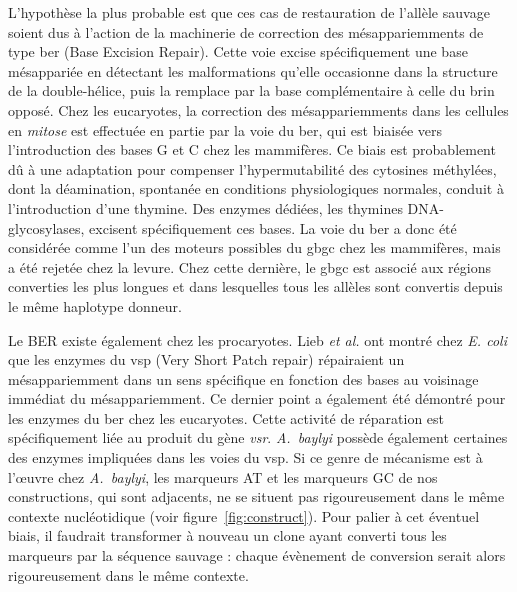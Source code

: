 L'hypothèse la plus probable est que ces cas de restauration de l'allèle sauvage
soient dus à l'action de la machinerie de correction des mésappariemments de
type \ac{ber} (Base Excision Repair). Cette voie excise spécifiquement une base
mésappariée en détectant les malformations qu'elle occasionne dans la structure
de la double-hélice, puis la remplace par la base complémentaire à celle du brin
opposé\cite{krokan_base_2013}. Chez les eucaryotes, la correction des
mésappariemments dans les cellules en \emph{mitose} est effectuée en partie par
la voie du \ac{ber}, qui est biaisée vers l'introduction des bases G et C chez
les mammifères\cite{brown_specific_1987,brown_different_1988}. Ce biais est
probablement dû à une adaptation pour compenser l'hypermutabilité des cytosines
méthylées, dont la déamination, spontanée en conditions physiologiques normales,
conduit à l'introduction d'une thymine. Des enzymes dédiées, les thymines
DNA-glycosylases, excisent spécifiquement ces bases. La voie du \ac{ber} a donc
été considérée comme l'un des moteurs possibles du \ac{gbgc} chez les
mammifères\cite{duret_biased_2009}, mais a été rejetée chez la
levure\cite{lesecque_gc-biased_2013}. Chez cette dernière, le \ac{gbgc} est
associé aux régions converties les plus longues et dans lesquelles tous les
allèles sont convertis depuis le même haplotype donneur.

Le BER existe également chez les procaryotes. Lieb \emph{et
  al.}\cite{lieb_recombination_1985} ont montré chez \emph{E. coli} que les
enzymes du \ac{vsp} (Very Short Patch repair) répairaient un mésappariemment
dans un sens spécifique en fonction des bases au voisinage immédiat du
mésappariemment. Ce dernier point a également été démontré pour les enzymes du
\ac{ber} chez les eucaryotes\cite{brown_different_1988}. Cette activité de
réparation est spécifiquement liée au produit du gène
\emph{vsr}\cite{hennecke_vsr_1991,lieb_specific_1983}. \emph{A.~baylyi} possède
également certaines des enzymes impliquées dans les voies du
\ac{vsp}\cite{kanehisa_kegg_2016}. Si ce genre de mécanisme est à l'œuvre chez
\emph{A.~baylyi}, les marqueurs AT et les marqueurs GC de nos constructions, qui
sont adjacents, ne se situent pas rigoureusement dans le même contexte
nucléotidique (voir figure~\ref{fig:construct}). Pour palier à cet éventuel
biais, il faudrait transformer à nouveau un clone ayant converti tous les
marqueurs par la séquence sauvage : chaque évènement de conversion serait alors
rigoureusement dans le même contexte.

